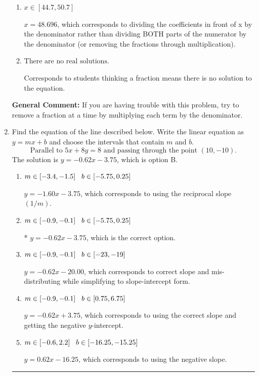 \documentclass{extbook}[14pt]
\newcommand{\litem}[1]{\item #1

\rule{\textwidth}{0.4pt}}
\begin{document}
\begin{enumerate}
{\begin{enumerate}[label=\Alph*.]
* $x = 13.261$, which is the correct option.
\item \( x \in [44.7, 50.7] \)

 $x = 48.696$, which corresponds to dividing the coefficients in front of x by the denominator rather than dividing BOTH parts of the numerator by the denominator (or removing the fractions through multiplication).
\item \( \text{There are no real solutions.} \)

Corresponds to students thinking a fraction means there is no solution to the equation.
\end{enumerate}

\textbf{General Comment:} If you are having trouble with this problem, try to remove a fraction at a time by multiplying each term by the denominator.
}
\litem{
Find the equation of the line described below. Write the linear equation as $ y=mx+b $ and choose the intervals that contain $m$ and $b$.
\[ \text{Parallel to } 5 x + 8 y = 8 \text{ and passing through the point } (10, -10). \]The solution is \( y = -0.62x - 3.75 \), which is option B.\begin{enumerate}[label=\Alph*.]
\item \( m \in [-3.4, -1.5] \hspace*{3mm} b \in [-5.75, 0.25] \)

 $y = -1.60x - 3.75$, which corresponds to using the reciprocal slope $(1/m)$.
\item \( m \in [-0.9, -0.1] \hspace*{3mm} b \in [-5.75, 0.25] \)

* $y = -0.62x - 3.75$, which is the correct option.
\item \( m \in [-0.9, -0.1] \hspace*{3mm} b \in [-23, -19] \)

 $y = -0.62x - 20.00$, which corresponds to correct slope and mis-distributing while simplifying to slope-intercept form.
\item \( m \in [-0.9, -0.1] \hspace*{3mm} b \in [0.75, 6.75] \)

 $y = -0.62x + 3.75$, which corresponds to using the correct slope and getting the negative $y$-intercept.
\item \( m \in [-0.6, 2.2] \hspace*{3mm} b \in [-16.25, -15.25] \)

 $y = 0.62x - 16.25$, which corresponds to using the negative slope.
\end{enumerate}

}
\end{enumerate}
\end{document}

